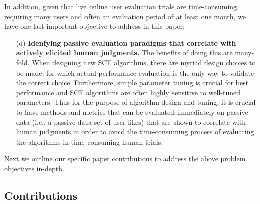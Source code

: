 \documentclass{sig-alternate}
\begin{document}
In addition, given that live online user evaluation trials are
time-consuming, requiring many users and often an evaluation period of
at least one month, we have one last important objective to address in
this paper:
\begin{enumerate}
\item[(d)] {\bf Idenfying passive evaluation paradigms that correlate
with actively elicited human judgments.}  The benefits of doing this
are many-fold.  When designing new SCF algorithms, there are myriad
design choices to be made, for which actual performance evaluation is
the only way to validate the correct choice.  Furthermore, simple
parameter tuning is crucial for best performance and SCF algorithms
are often highly sensitive to well-tuned parameters.  Thus for the
purpose of algorithm design and tuning, it is crucial to have methods
and metrics that can be evaluated immediately on passive data (i.e., a
passive data set of user likes) that are shown to correlate with human
judgments in order to avoid the time-consuming process of evaluating
the algorithms in time-consuming human trials.
\end{enumerate}

Next we outline our specific paper contributions to address
the above problem objectives in-depth.

\subsection{Contributions}

\label{sec:Contributions}
\end{document}
